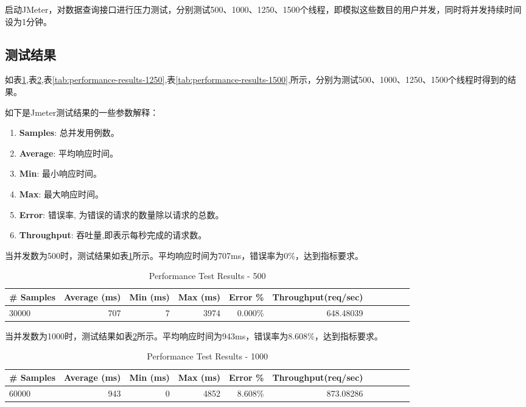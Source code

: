 \documentclass[oneside]{xduugthesis}
\begin{document}
启动JMeter，对数据查询接口进行压力测试，分别测试500、1000、1250、1500个线程，即模拟这些数目的用户并发，同时将并发持续时间设为1分钟。

\subsection{测试结果}

如表\ref{tab:performance-results-500},表\ref{tab:performance-results-1000},表\ref{tab:performance-results-1250},表\ref{tab:performance-results-1500},所示，分别为测试500、1000、1250、1500个线程时得到的结果。

如下是Jmeter测试结果的一些参数解释：

\begin{enumerate}[nosep]
    \item \textbf{Samples}: 总并发用例数。
    \item \textbf{Average}: 平均响应时间。
    \item \textbf{Min}: 最小响应时间。
    \item \textbf{Max}: 最大响应时间。
    \item \textbf{Error}: 错误率, 为错误的请求的数量除以请求的总数。
    \item \textbf{Throughput}: 吞吐量,即表示每秒完成的请求数。
\end{enumerate}

当并发数为500时，测试结果如表\ref{tab:performance-results-500}所示。平均响应时间为707ms，错误率为0\%，达到指标要求。

\begin{table}[htb]
\centering
\caption{Performance Test Results - 500}
\begin{tabular}{lrrrrrrrrrr}\hline
\toprule
\textbf{\# Samples} & \textbf{Average (ms)} & \textbf{Min (ms)} & \textbf{Max (ms)} & \textbf{Error \%} & \textbf{Throughput(req/sec)} \\\hline
\midrule
30000&707&7&3974&0.000\%&648.48039\\\hline
\bottomrule
\end{tabular}
\label{tab:performance-results-500}
\end{table}

当并发数为1000时，测试结果如表\ref{tab:performance-results-1000}所示。平均响应时间为943ms，错误率为8.608\%，达到指标要求。

\begin{table}[htb]
\centering
\caption{Performance Test Results - 1000}
\begin{tabular}{lrrrrrrrrrr}\hline
\toprule
\textbf{\# Samples} & \textbf{Average (ms)} & \textbf{Min (ms)} & \textbf{Max (ms)} & \textbf{Error \%} & \textbf{Throughput(req/sec)} \\\hline
\midrule
60000&943&0&4852&8.608\%&873.08286 \\\hline
\bottomrule
\end{tabular}
\label{tab:performance-results-1000}
\end{table}
\end{document}
